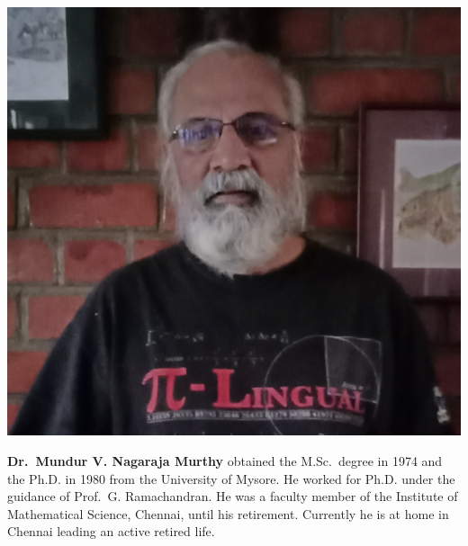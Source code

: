 \centerline{\includegraphics[scale=.1]{authorsphotos/Prof_M_V_N_Murthy.jpg}}
\bigskip 

\noindent
\textbf{Dr.\ Mundur V. Nagaraja Murthy} obtained the M.Sc.\ degree in 1974 and the Ph.D. in 1980 from the University of Mysore. He worked for Ph.D. under the guidance of Prof.\ G. Ramachandran. He was a faculty member of the Institute of Mathematical Science, Chennai, until his retirement. Currently he is at home in Chennai leading an active retired life.
